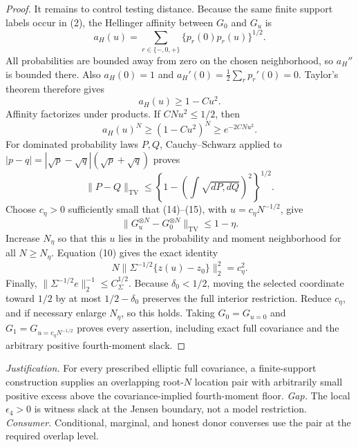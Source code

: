 \documentclass{article}
\begin{document}
\begin{proof}
It remains to control testing distance.  Because the same finite support labels occur in (2), the Hellinger affinity between \(G_0\) and \(G_u\) is
\[
 a_H(u)=\sum_{r\in\{-,0,+\}}\{p_r(0)p_r(u)\}^{1/2}.       \tag{12}
\]
All probabilities are bounded away from zero on the chosen neighborhood, so \(a_H''\) is bounded there.  Also
\(a_H(0)=1\) and
\(a_H'(0)=\tfrac12\sum_rp_r'(0)=0\).  Taylor's theorem therefore gives
\[
 a_H(u)\ge1-Cu^2.                                          \tag{13}
\]
Affinity factorizes under products.  If \(CNu^2\le1/2\), then
\[
 a_H(u)^N\ge(1-Cu^2)^N\ge e^{-2CNu^2}.                    \tag{14}
\]
For dominated probability laws \(P,Q\), Cauchy--Schwarz applied to
\(|p-q|=|\sqrt p-\sqrt q|(\sqrt p+\sqrt q)\) proves
\[
 \|P-Q\|_{\mathrm{TV}}
 \le\left\{1-\left(\int\sqrt{dP,dQ}\right)^2\right\}^{1/2}. \tag{15}
\]
Choose \(c_\eta>0\) sufficiently small that (14)--(15), with
\(u=c_\eta N^{-1/2}\), give
\[
 \|G_u^{\otimes N}-G_0^{\otimes N}\|_{\mathrm{TV}}
 \le1-\eta.                                                 \tag{16}
\]
Increase \(N_\eta\) so that this \(u\) lies in the probability and moment neighborhood for all \(N\ge N_\eta\).  Equation (10) gives the exact identity
\[
 N\|\Sigma^{-1/2}\{z(u)-z_0\}\|_2^2=c_\eta^2.           \tag{17}
\]
Finally,
\(\|\Sigma^{-1/2}e\|_2^{-1}\le C_\Sigma^{1/2}\).  Because \(\delta_0<1/2\), moving the selected coordinate toward \(1/2\) by at most \(1/2-\delta_0\) preserves the full interior restriction.  Reduce \(c_\eta\), and if necessary enlarge \(N_\eta\), so this holds.  Taking \(G_0=G_{u=0}\) and \(G_1=G_{u=c_\eta N^{-1/2}}\) proves every assertion, including exact full covariance and the arbitrary positive fourth-moment slack.
\end{proof}
\par\smallskip\noindent \textit{Justification.} For every prescribed elliptic full covariance, a finite-support construction supplies an overlapping root-\(N\) location pair with arbitrarily small positive excess above the covariance-implied fourth-moment floor. \textit{Gap.} The local \(\epsilon_4>0\) is witness slack at the Jensen boundary, not a model restriction. \textit{Consumer.} Conditional, marginal, and honest donor converses use the pair at the required overlap level.
\end{document}
